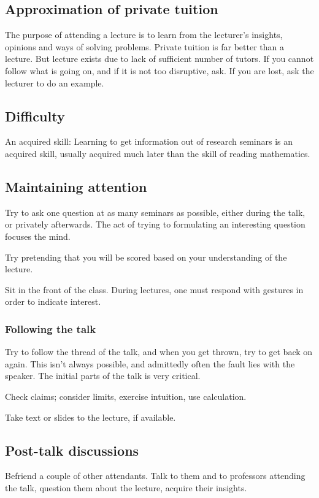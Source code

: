\documentclass[oneside, article]{memoir}
\begin{document}
\subsection{Approximation of private tuition}
The purpose of attending a lecture is to learn from the lecturer's insights, opinions and ways of solving problems. Private tuition is far better than a lecture. But lecture exists due to lack of sufficient number of tutors. If you cannot follow what is going on, and if it is not too disruptive, ask. If you are lost, ask the lecturer to do an example.

\subsection{Difficulty}
An acquired skill: Learning to get information out of research seminars is an acquired skill, usually acquired much later than the skill of reading mathematics.

\subsection{Maintaining attention}
Try to ask one question at as many seminars as possible, either during the talk, or privately afterwards. The act of trying to formulating an interesting question focuses the mind.

Try pretending that you will be scored based on your understanding of the lecture.

Sit in the front of the class. During lectures, one must respond with gestures in order to indicate interest.

\subsubsection{Following the talk}
Try to follow the thread of the talk, and when you get thrown, try to get back on again. This isn't always possible, and admittedly often the fault lies with the speaker. The initial parts of the talk is very critical.

Check claims; consider limits, exercise intuition, use calculation.

Take text or slides to the lecture, if available.

\subsection{Post-talk discussions}
Befriend a couple of other attendants. Talk to them and to professors attending the talk, question them about the lecture, acquire their insights.
\end{document}
